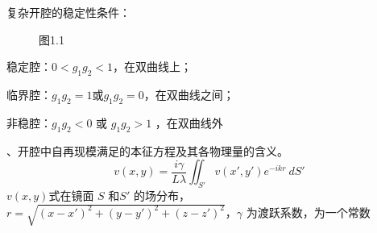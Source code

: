 \documentclass[12pt]{article}
\begin{document}
{\kaishu
复杂开腔的稳定性条件：

\begin{figure}[H]
\begin{center}
\end{center}
\caption*{图1.1}%
\end{figure}
\par 稳定腔：$ 0 < g_1g_2 < 1$，在双曲线上；
\par 临界腔：$  g_1g_2 = 1$或$g_1g_2=0$，在双曲线之间；
\par 非稳腔：$g_1g_2<0$ 或 $g_1g_2>1$ ，在双曲线外
\\


}

{、开腔中自再现模满足的本征方程及其各物理量的含义。
}
{\kaishu
\begin{equation*}
	v(x,y)=\frac{i\gamma}{L\lambda} \iint_{{S'}}^{{}} {v(x',y')e^{-ikr}} \: d{S'} {}
\end{equation*}
$v(x,y)$式在镜面 $S$ 和$S'$ 的场分布， $r=\sqrt{(x-x')^2+(y-y')^2+(z-z')^2}$，$\gamma$ 为渡跃系数，为一个常数
\\}
\end{document}
